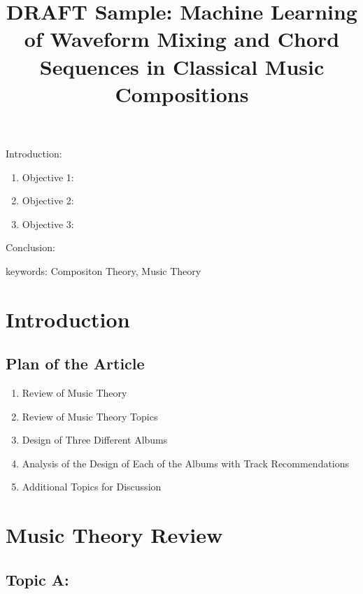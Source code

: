 


\twocolumn
\scriptsize
\begin{frontmatter}
		\title{DRAFT Sample: Machine Learning of Waveform Mixing and Chord Sequences in Classical Music Compositions}
		\author{}
		\address{The Mathematical Learning Space}
\end{frontmatter}	

Introduction:
\begin{enumerate}
\item Objective 1:
\item Objective 2:
\item Objective 3:
\end{enumerate}
Conclusion:

keywords: Compositon Theory, Music Theory

\section{Introduction}


\subsection{Plan of the Article}

\begin{enumerate}
\item Review of Music Theory
\item Review of Music Theory Topics
\item Design of Three Different Albums
\item Analysis of the Design of Each of the Albums with Track Recommendations
\item Additional Topics for Discussion
\end{enumerate}

\section{Music Theory Review}

\subsection{Topic A:}

